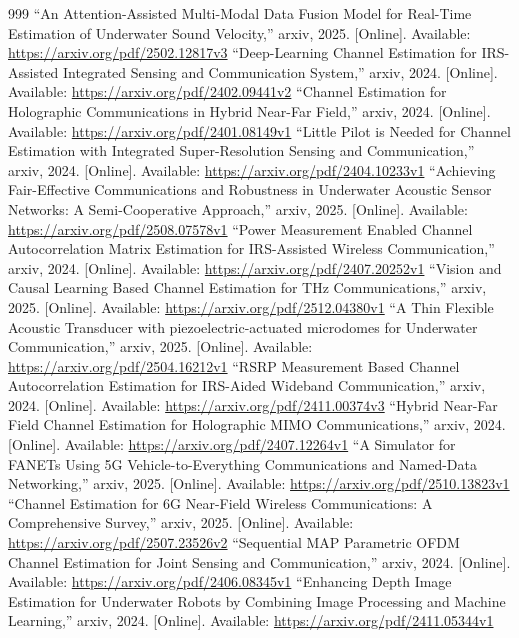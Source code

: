 \documentclass[10pt,journal]{IEEEtran}
\begin{document}
\begin{thebibliography}{999}
 ``An Attention-Assisted Multi-Modal Data Fusion Model for Real-Time Estimation of Underwater Sound Velocity,'' arxiv, 2025. [Online]. Available: \url{https://arxiv.org/pdf/2502.12817v3}
 ``Deep-Learning Channel Estimation for IRS-Assisted Integrated Sensing and Communication System,'' arxiv, 2024. [Online]. Available: \url{https://arxiv.org/pdf/2402.09441v2}
 ``Channel Estimation for Holographic Communications in Hybrid Near-Far Field,'' arxiv, 2024. [Online]. Available: \url{https://arxiv.org/pdf/2401.08149v1}
 ``Little Pilot is Needed for Channel Estimation with Integrated Super-Resolution Sensing and Communication,'' arxiv, 2024. [Online]. Available: \url{https://arxiv.org/pdf/2404.10233v1}
 ``Achieving Fair-Effective Communications and Robustness in Underwater Acoustic Sensor Networks: A Semi-Cooperative Approach,'' arxiv, 2025. [Online]. Available: \url{https://arxiv.org/pdf/2508.07578v1}
 ``Power Measurement Enabled Channel Autocorrelation Matrix Estimation for IRS-Assisted Wireless Communication,'' arxiv, 2024. [Online]. Available: \url{https://arxiv.org/pdf/2407.20252v1}
 ``Vision and Causal Learning Based Channel Estimation for THz Communications,'' arxiv, 2025. [Online]. Available: \url{https://arxiv.org/pdf/2512.04380v1}
 ``A Thin Flexible Acoustic Transducer with piezoelectric-actuated microdomes for Underwater Communication,'' arxiv, 2025. [Online]. Available: \url{https://arxiv.org/pdf/2504.16212v1}
 ``RSRP Measurement Based Channel Autocorrelation Estimation for IRS-Aided Wideband Communication,'' arxiv, 2024. [Online]. Available: \url{https://arxiv.org/pdf/2411.00374v3}
 ``Hybrid Near-Far Field Channel Estimation for Holographic MIMO Communications,'' arxiv, 2024. [Online]. Available: \url{https://arxiv.org/pdf/2407.12264v1}
 ``A Simulator for FANETs Using 5G Vehicle-to-Everything Communications and Named-Data Networking,'' arxiv, 2025. [Online]. Available: \url{https://arxiv.org/pdf/2510.13823v1}
 ``Channel Estimation for 6G Near-Field Wireless Communications: A Comprehensive Survey,'' arxiv, 2025. [Online]. Available: \url{https://arxiv.org/pdf/2507.23526v2}
 ``Sequential MAP Parametric OFDM Channel Estimation for Joint Sensing and Communication,'' arxiv, 2024. [Online]. Available: \url{https://arxiv.org/pdf/2406.08345v1}
 ``Enhancing Depth Image Estimation for Underwater Robots by Combining Image Processing and Machine Learning,'' arxiv, 2024. [Online]. Available: \url{https://arxiv.org/pdf/2411.05344v1}

\end{thebibliography}
\end{document}
